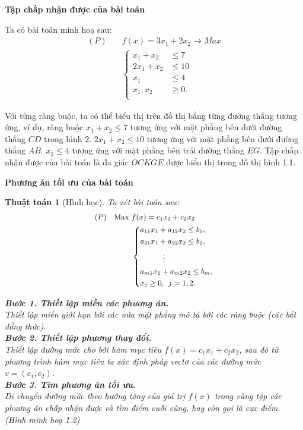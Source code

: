 \documentclass[12pt,a4paper]{report}
\newtheorem{ttoan}{Thuật toán}
\begin{document}
 \textbf{Tập chấp nhận được của bài toán}

Ta có bài toán minh hoạ sau:
\begin{equation}
	\begin{split}
	(P) \quad & f(x) = 3x_1 + 2x_2 \longrightarrow Max \\
		& \left\{\begin{split}
		x_1 + x_2 &\leq 7 \\
		2x_1 + x_2 &\leq 10 \\
		x_1 &\leq 4 \\
		x_1, x_2 &\geq 0. \\
		\end{split}\right.    
	\end{split}
\end{equation}

Với từng ràng buộc, ta có thể biểu thị trên đồ thị bằng từng đường thẳng tương ứng, ví dụ, ràng buộc
$x_1 + x_2 \leq 7$
tương ứng với mặt phẳng bên dưới đường thẳng $CD$ trong hình 2.
$2x_1 + x_2 \leq 10$
tương ứng với mặt phẳng bên dưới đường thẳng $AB$.
$x_1 \leq 4$
tương ứng với mặt phẳng bên trái đường thẳng $EG$. Tập chấp nhận được của bài toán là đa giác $OCKGE$ được biểu thị trong đồ thị hình 1.1.

 \textbf{Phương án tối ưu của bài toán}

\begin{ttoan}[Hình học]
\setlength{\parindent}{4em}
Ta xét bài toán sau:
\begin{equation} \small
	\begin{split}
	(P) \quad \text{Max } & f(x) = c_1x_1 + c_2x_2 \\
		& \left\{
		\begin{split}
        & a_{11}x_1 +a_{12}x_2 \leq b_1, \\
        & a_{21}x_1 +a_{22}x_2 \leq b_2, \\
        & \quad \quad \quad \vdots \\
        & a_{m1}x_1 +a_{m2}x_2 \leq b_m, \\
		& x_j \geq 0, \:\: j=1,2.
		\end{split}
		\right.    
	\end{split}
\end{equation}

\noindent \textbf{Bước 1. Thiết lập miền các phương án.} \\
Thiết lập miền giới hạn bởi các nửa mặt phẳng mô tả bởi các ràng buộc (các bất đẳng thức). \\
\noindent \textbf{Bước 2. Thiết lập phương thay đổi.} \\
Thiết lập đường mức cho bởi hàm mục tiêu $f(x)=c_1x_1+c_2x_2$, sau đó từ phương trình hàm mục tiêu ta xác định pháp vectơ của các đường mức $v=(c_1, c_2)$. \\
\noindent \textbf{Bước 3. Tìm phương án tối ưu.} \\
Di chuyển đường mức theo hướng tăng của giá trị $f(x)$ trong vùng tập các phương án chấp nhận được và tìm điểm cuối cùng, hay còn gọi là cực điểm. (Hình minh hoạ 1.2)
\end{ttoan}
\end{document}
